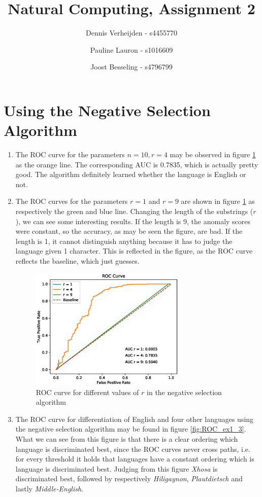 \documentclass[11pt]{article}
\title{Natural Computing, Assignment 2}
\author{Dennis Verheijden - s4455770 \and Pauline Lauron - s1016609 \and Joost Besseling - s4796799}
\begin{document}
\maketitle

\section{Using the Negative Selection Algorithm}
\begin{enumerate}[1.]
\item The ROC curve for the parameters $n=10, r=4$ may be observed in figure \ref{fig:ROC_ex1} as the orange line. The corresponding AUC is 0.7835, which is actually pretty good. The algorithm definitely learned whether the language is English or not.

\item The ROC curves for the parameters $r=1$ and $r=9$ are shown in figure \ref{fig:ROC_ex1} as respectively the green and blue line. Changing the length of the substrings ($r$), we can see some interesting results. If the length is 9, the anomaly scores were constant, so the accuracy, as may be seen the figure, are bad. If the length is 1, it cannot distinguish anything because it has to judge the language given 1 character. This is reflected in the figure, as the ROC curve reflects the baseline, which just guesses.

\begin{figure}[H]
\centering
\includegraphics[width=0.7\textwidth]{images/roc_ex1.eps}
\caption{ROC curve for different values of $r$ in the negative selection algorithm}
\label{fig:ROC_ex1}
\end{figure}

\newpage

\item The ROC curve for differentiation of English and four other languages using the negative selection algorithm may be found in figure \ref{fig:ROC_ex1_3}. What we can see from this figure is that there is a clear ordering which language is discriminated best, since the ROC curves never cross paths, i.e. for every threshold it holds that languages have a constant ordering which is language is discriminated best. Judging from this figure \textit{Xhosa} is discriminated best, followed by respectively \textit{Hiligaynon}, \textit{Plautdietsch} and lastly \textit{Middle-English}.


\end{enumerate}
\end{document}
